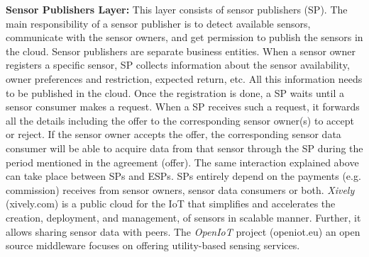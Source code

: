 \documentclass[conference]{IEEEtran}
\begin{document}
\textbf{Sensor Publishers Layer:} This layer consists of sensor publishers (SP). The main responsibility of a sensor publisher is to detect available sensors, communicate with the sensor owners, and get  permission to publish the sensors in the cloud. Sensor publishers are separate business entities. When a sensor owner registers a specific sensor, SP collects information about the sensor availability, owner preferences and restriction, expected return, etc. All this information needs to be published in the cloud. Once the registration is done, a SP waits until a sensor consumer makes a request. When a SP receives such a request, it forwards all the details including the offer to the corresponding sensor owner(s) to accept or reject. If the sensor owner accepts the offer, the corresponding sensor data consumer will be able to acquire  data from that sensor through the SP during the period mentioned in the agreement (offer). The same interaction explained above can take place between SPs and ESPs. SPs entirely depend on the payments (e.g. commission) receives from sensor owners, sensor data consumers or both. \textit{Xively} (xively.com) is a public cloud for the IoT that simplifies and accelerates the creation, deployment, and management, of sensors in scalable manner. Further, it allows sharing sensor data with peers. The \textit{OpenIoT} project (openiot.eu)  an open source middleware  focuses on offering utility-based sensing services.
\end{document}
